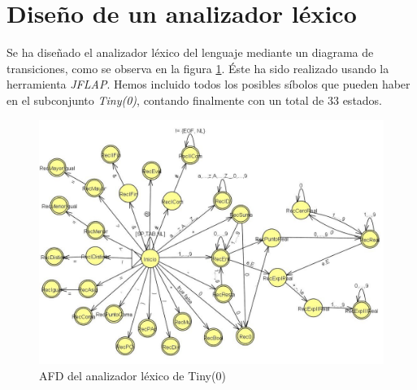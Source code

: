 \section{Diseño de un analizador léxico}

Se ha diseñado el analizador léxico del lenguaje mediante un diagrama de transiciones, como se observa en la figura \ref{fig:diag_afd}.
Éste ha sido realizado usando la herramienta \textit{JFLAP}. Hemos incluido todos los posibles síbolos que pueden haber en
el subconjunto \textit{Tiny(0)}, contando finalmente con un total de 33 estados.

\begin{figure}[H]
    \centering
    \includegraphics[width=0.8\linewidth]{Secciones/Hito1/Tiny0/diagrama_afd.jpg}
    \caption{AFD del analizador léxico de Tiny(0)}
    \label{fig:diag_afd}
\end{figure}